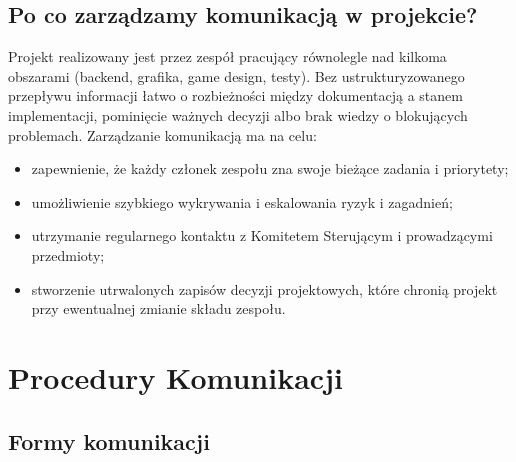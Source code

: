 \documentclass[11pt,a4paper]{article}
\begin{document}
\subsection{Po co zarządzamy komunikacją w projekcie?}
Projekt realizowany jest przez zespół pracujący równolegle nad kilkoma obszarami (backend, grafika, game design, testy). 
Bez ustrukturyzowanego przepływu informacji łatwo o rozbieżności między dokumentacją a stanem implementacji, 
pominięcie ważnych decyzji albo brak wiedzy o blokujących problemach. Zarządzanie komunikacją ma na celu:
\begin{itemize}[noitemsep]
    \item zapewnienie, że każdy członek zespołu zna swoje bieżące zadania i priorytety;
    \item umożliwienie szybkiego wykrywania i eskalowania ryzyk i zagadnień;
    \item utrzymanie regularnego kontaktu z Komitetem Sterującym i prowadzącymi przedmioty;
    \item stworzenie utrwalonych zapisów decyzji projektowych, które chronią projekt przy ewentualnej zmianie składu zespołu.
\end{itemize}

\section{Procedury Komunikacji}

\subsection{Formy komunikacji}
\end{document}
